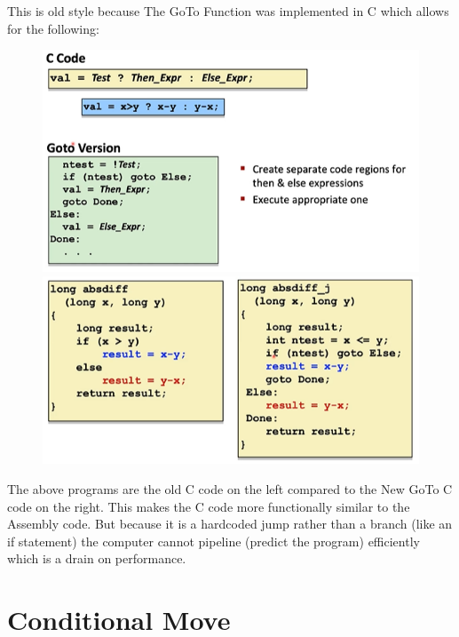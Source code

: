 \documentclass[12pt]{book}
\begin{document}
This is old style because The GoTo Function was implemented in C which allows for the following:
\begin{figure}[h]
        \centering
        \includegraphics[scale = 0.5]{./figures/gotoEx}
        \includegraphics[scale = 0.6]{./figures/gotoEx2}
\end{figure}

The above programs are the old C code on the left compared to the New GoTo C code on the right. This makes the C code more
functionally similar to the Assembly code. But because it is a hardcoded jump rather than a branch (like an if statement)
the computer cannot pipeline (predict the program) efficiently which is a drain on performance.
\pagebreak

\section*{Conditional Move}
\end{document}
